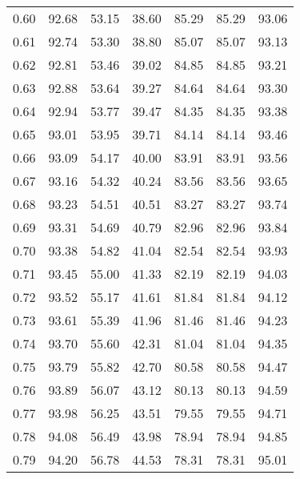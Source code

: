 \begin{tabular}{|c|c|c|c|c|c|c|}
      0.60 &     92.68 &     53.15 &      38.60 &   85.29 &      85.29 &         93.06 \\
      0.61 &     92.74 &     53.30 &      38.80 &   85.07 &      85.07 &         93.13 \\
      0.62 &     92.81 &     53.46 &      39.02 &   84.85 &      84.85 &         93.21 \\
      0.63 &     92.88 &     53.64 &      39.27 &   84.64 &      84.64 &         93.30 \\
      0.64 &     92.94 &     53.77 &      39.47 &   84.35 &      84.35 &         93.38 \\
      0.65 &     93.01 &     53.95 &      39.71 &   84.14 &      84.14 &         93.46 \\
      0.66 &     93.09 &     54.17 &      40.00 &   83.91 &      83.91 &         93.56 \\
      0.67 &     93.16 &     54.32 &      40.24 &   83.56 &      83.56 &         93.65 \\
      0.68 &     93.23 &     54.51 &      40.51 &   83.27 &      83.27 &         93.74 \\
      0.69 &     93.31 &     54.69 &      40.79 &   82.96 &      82.96 &         93.84 \\
      0.70 &     93.38 &     54.82 &      41.04 &   82.54 &      82.54 &         93.93 \\
      0.71 &     93.45 &     55.00 &      41.33 &   82.19 &      82.19 &         94.03 \\
      0.72 &     93.52 &     55.17 &      41.61 &   81.84 &      81.84 &         94.12 \\
      0.73 &     93.61 &     55.39 &      41.96 &   81.46 &      81.46 &         94.23 \\
      0.74 &     93.70 &     55.60 &      42.31 &   81.04 &      81.04 &         94.35 \\
      0.75 &     93.79 &     55.82 &      42.70 &   80.58 &      80.58 &         94.47 \\
      0.76 &     93.89 &     56.07 &      43.12 &   80.13 &      80.13 &         94.59 \\
      0.77 &     93.98 &     56.25 &      43.51 &   79.55 &      79.55 &         94.71 \\
      0.78 &     94.08 &     56.49 &      43.98 &   78.94 &      78.94 &         94.85 \\
      0.79 &     94.20 &     56.78 &      44.53 &   78.31 &      78.31 &         95.01 \\

\end{tabular}
